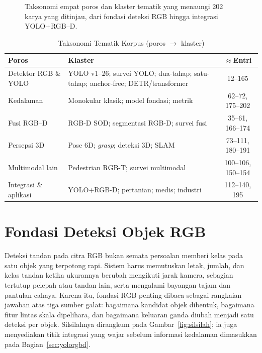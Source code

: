 \begin{figure}[t]
\centering
{}
\caption{Taksonomi empat poros dan klaster tematik yang menaungi 202 karya
yang ditinjau, dari fondasi deteksi RGB hingga integrasi YOLO+RGB--D.}
\label{fig:taksonomi}
\end{figure}

\begin{table}[t]
\centering
\caption{Taksonomi Tematik Korpus (poros $\rightarrow$ klaster)}
\label{tab:taksonomi}
\begin{tabular}{@{}p{2.4cm}p{4.6cm}c@{}}
\toprule
\textbf{Poros} & \textbf{Klaster} & \textbf{$\approx$Entri} \\
\midrule
Detektor RGB \& YOLO & YOLO v1--26; survei YOLO; dua-tahap; satu-tahap; anchor-free; DETR/transformer & 12--165 \\
Kedalaman & Monokular klasik; model fondasi; metrik & 62--72, 175--202 \\
Fusi RGB--D & RGB-D SOD; segmentasi RGB-D; survei fusi & 35--61, 166--174 \\
Persepsi 3D & Pose 6D; \textit{grasp}; deteksi 3D; SLAM & 73--111, 180--191 \\
Multimodal lain & Pedestrian RGB-T; survei multimodal & 100--106, 150--154 \\
Integrasi \& aplikasi & YOLO+RGB-D; pertanian; medis; industri & 112--140, 195 \\
\bottomrule
\end{tabular}
\end{table}


\section{Fondasi Deteksi Objek RGB}\label{sec:rgb}
Deteksi tandan pada citra RGB bukan semata persoalan memberi kelas pada satu objek yang terpotong rapi. Sistem harus memutuskan letak, jumlah, dan kelas tandan ketika ukurannya berubah mengikuti jarak kamera, sebagian tertutup pelepah atau tandan lain, serta mengalami bayangan tajam dan pantulan cahaya. Karena itu, fondasi RGB penting dibaca sebagai rangkaian jawaban atas tiga sumber galat: bagaimana kandidat objek dibentuk, bagaimana fitur lintas skala dipelihara, dan bagaimana keluaran ganda diubah menjadi satu deteksi per objek. Silsilahnya dirangkum pada Gambar~\ref{fig:silsilah}; ia juga menyediakan titik integrasi yang wajar sebelum informasi kedalaman dimasukkan pada Bagian~\ref{sec:yolorgbd}.

